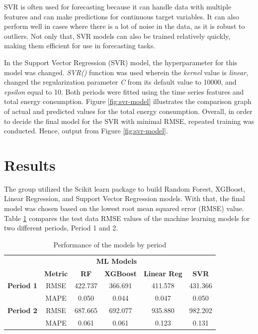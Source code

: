 \documentclass[runningheads]{llncs}
\begin{document}
SVR is often used for forecasting because it can handle data with multiple features and can make predictions for continuous target variables. It can also perform well in cases where there is a lot of noise in the data, as it is robust to outliers. Not only that, SVR models can also be trained relatively quickly, making them efficient for use in forecasting tasks.

In the Support Vector Regression (SVR) model, the hyperparameter for this model was changed. \textit{SVR()} function was used wherein the \textit{kernel} value is \textit{linear}, changed the regularization parameter \textit{C} from its default value to 10000, and \textit{epsilon} equal to 10. Both periods were fitted using the time series features and total energy consumption. Figure \ref{fig:svr-model} illustrates the comparison graph of actual and predicted values for the total energy consumption. Overall, in order to decide the final model for the SVR with minimal RMSE, repeated training was conducted. Hence, output from Figure \ref{fig:svr-model}. 

\section{Results}
The group utilized the Scikit learn package to build Random Forest, XGBoost, Linear Regression, and Support Vector Regression models. With that, the final model was chosen based on the lowest root mean squared error (RMSE) value. Table \ref{tab:perf} compares the test data RMSE values of the machine learning models for two different periods, Period 1 and 2.

\begin{center}
\begin{table}[]
    \centering
    \caption{Performance of the models by period}
    \label{tab:perf}
    \begin{tabular}{cccccc}
    \hline
    \multicolumn{4}{r}{\textbf{ML Models}} \\
    \cline{3-6}
      & \textbf{Metric}    & \textbf{RF}    & \textbf{XGBoost}  & \textbf{Linear Reg}    & \textbf{SVR}      \\
    \hline
    \textbf{Period 1}    & RMSE      & 422.737   & 366.691   & 411.578   & 431.366\\
                & MAPE      & 0.050     & 0.044     & 0.047     & 0.050\\
    \hline
    \hline
    \textbf{Period 2}    & RMSE      & 687.665   & 692.077   & 935.880   & 982.202\\
                & MAPE      & 0.061     & 0.061     & 0.123     & 0.131\\
    \hline
    \end{tabular}
\end{table}
\end{center}
\end{document}
